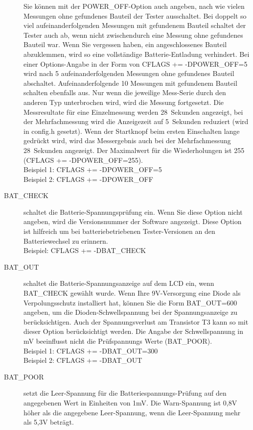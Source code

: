 \begin{description}
Sie können mit der POWER\_OFF-Option auch angeben, nach wie vielen Messungen ohne gefundenes Bauteil der Tester ausschaltet.
Bei doppelt so viel aufeinanderfolgenden Messungen mit gefundenem Bauteil schaltet der Tester auch ab,
wenn nicht zwischendurch eine Messung ohne gefundenes Bauteil war.
Wenn Sie vergessen haben, ein angeschlossenes Bauteil abzuklemmen, wird so eine vollständige Batterie-Entladung
verhindert.
Bei einer Options-Angabe in der Form von CFLAGS += -DPOWER\_OFF=5 wird nach 5 aufeinanderfolgenden Messungen ohne
gefundenes Bauteil abschaltet. Aufeinanderfolgende 10 Messungen mit gefundenem Bauteil schalten ebenfalls aus.
Nur wenn die jeweilige Mess-Serie durch den anderen Typ unterbrochen wird, wird die Messung fortgesetzt.
Die Messresultate für eine Einzelmessung werden 28~Sekunden angezeigt, bei der Mehrfachmessung wird die
Anzeigezeit auf 5~Sekunden reduziert (wird in config.h gesetzt).
Wenn der Startknopf beim ersten Einschalten lange gedrückt wird, wird das Messergebnis
 auch bei der Mehrfachmessung 28~Sekunden angezeigt.
Der Maximalwert für die Wiederholungen ist 255 (CFLAGS += -DPOWER\_OFF=255).\\
Beispiel 1: CFLAGS += -DPOWER\_OFF=5 \\
Beispiel 2: CFLAGS += -DPOWER\_OFF 
  \item[BAT\_CHECK] schaltet die Batterie-Spannungsprüfung ein.
 Wenn Sie diese Option nicht angeben, wird die Versionsnummer der Software angezeigt.
Diese Option ist hilfreich um bei batteriebetriebenen Tester-Versionen an den Batteriewechsel zu erinnern.\\
Beispiel: CFLAGS += -DBAT\_CHECK
  \item[BAT\_OUT] schaltet die Batterie-Spannungsanzeige auf dem LCD ein, wenn BAT\_CHECK gewählt wurde.
 Wenn Ihre 9V-Versorgung eine Diode als Verpolungsschutz installiert hat, können Sie 
die Form BAT\_OUT=600 angeben, um die Dioden-Schwellspannung 
bei der Spannungsanzeige zu berücksichtigen.
Auch der Spannungsverlust am Transistor T3 kann so mit dieser Option berücksichtigt werden.
Die Angabe der Schwellspannung in mV beeinflusst nicht die Prüf\-span\-nungs Werte (BAT\_POOR).\\
Beispiel 1: CFLAGS += -DBAT\_OUT=300 \\
Beispiel 2: CFLAGS += -DBAT\_OUT
  \item[BAT\_POOR] setzt die Leer-Spannung für die Batteriespannungs-Prüfung auf den angegebenen Wert in Einheiten von 1mV.
Die Warn-Spannung ist 0,8V höher als die angegebene Leer-Spannung, wenn die Leer-Spannung mehr als 5,3V beträgt.

\end{description}
